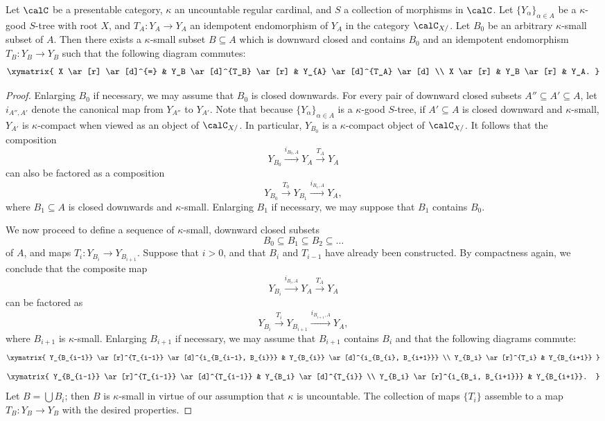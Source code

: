 \begin{lemma}\label{turkteck}
Let $\calC$ be a presentable category, $\kappa$ an uncountable regular cardinal, and 
$S$ a collection of morphisms in $\calC$. Let $\{ Y_{\alpha} \}_{\alpha \in A}$ be a $\kappa$-good $S$-tree with root $X$, and $T_A: Y_{A} \rightarrow Y_{A}$ an idempotent endomorphism of
$Y_{A}$ in the category $\calC_{X/}$. Let $B_0$ be an arbitrary $\kappa$-small subset of
$A$. Then there exists a $\kappa$-small subset $B \subseteq A$ which is downward closed and contains $B_0$ and an idempotent endomorphism $T_{B}: Y_{B} \rightarrow Y_{B}$
such that the following diagram commutes:
$$ \xymatrix{ X \ar[r] \ar[d]^{=} & Y_B \ar[d]^{T_B} \ar[r] & Y_{A} \ar[d]^{T_A} \ar[d] \\
X \ar[r] & Y_B \ar[r] & Y_A. }$$
\end{lemma}

\begin{proof}
Enlarging $B_0$ if necessary, we may assume that $B_0$ is closed downwards. 
For every pair of downward closed subsets $A'' \subseteq A' \subseteq A$, let
$i_{A'',A'}$ denote the canonical map from $Y_{A''}$ to $Y_{A'}$.
Note that because $\{ Y_{\alpha} \}_{\alpha \in A}$ is a $\kappa$-good $S$-tree, if
$A' \subseteq A$ is closed downward and $\kappa$-small, $Y_{A'}$ is $\kappa$-compact when 
viewed as an object of $\calC_{X/}$. In particular, $Y_{B_0}$ is a $\kappa$-compact object of $\calC_{X/}$. It follows that the composition
$$ Y_{B_0} \stackrel{i_{B_0,A}}{\rightarrow} Y_{A} \stackrel{T_A}{\rightarrow} Y_{A}$$
can also be factored as a composition
$$ Y_{B_0} \stackrel{T_0}{\rightarrow} Y_{B_1} \stackrel{ i_{B_1,A}}{\rightarrow} Y_A,$$
where $B_1 \subseteq A$ is closed downwards and $\kappa$-small. Enlarging $B_1$ if necessary, we may suppose that $B_1$ contains $B_0$.

We now proceed to define a sequence of $\kappa$-small, downward closed subsets
$$ B_0 \subseteq B_1 \subseteq B_2 \subseteq \ldots $$
of $A$, and maps $T_i: Y_{B_i} \rightarrow Y_{B_{i+1}}$. Suppose that $i > 0$, and that
$B_{i}$ and $T_{i-1}$ have already been constructed. By compactness again, we conclude that the composite map
$$ Y_{B_i} \stackrel{ i_{B_i, A}}{\rightarrow} Y_{A} \stackrel{T_A}{\rightarrow} Y_A $$
can be factored as
$$ Y_{B_i} \stackrel{ T_{i} }{\rightarrow} Y_{B_{i+1} } \stackrel{ i_{B_{i+1}, A}}{\rightarrow} Y_A,$$
where $B_{i+1}$ is $\kappa$-small. Enlarging $B_{i+1}$ if necessary, we may assume that
$B_{i+1}$ contains $B_{i}$ and that the following diagrams commute:
$$ \xymatrix{ Y_{B_{i-1}} \ar[r]^{T_{i-1}} \ar[d]^{i_{B_{i-1}, B_{i}}} & Y_{B_{i}} \ar[d]^{i_{B_{i}, B_{i+1}}} \\
Y_{B_i} \ar[r]^{T_i} & Y_{B_{i+1}} }$$
$$ \xymatrix{ Y_{B_{i-1}} \ar[r]^{T_{i-1}} \ar[d]^{T_{i-1}} & Y_{B_i} \ar[d]^{T_{i}} \\
Y_{B_i} \ar[r]^{i_{B_i, B_{i+1}}} & Y_{B_{i+1}}. }$$
Let $B = \bigcup B_i$; then $B$ is $\kappa$-small in virtue of our assumption that $\kappa$ is uncountable. The collection of maps $\{ T_i \}$ assemble to a map $T_{B}: Y_{B} \rightarrow Y_{B}$ with the desired properties.
\end{proof}

